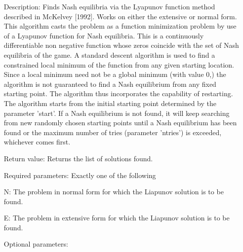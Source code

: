 \begin{itemize}
\bd
\item
[Description:] Finds Nash equilibria via the Lyapunov function method
described in McKelvey [1992].  Works on either the extensive or normal
form.  This algorithm casts the problem as a function minimization
problem by use of a Lyapunov function for Nash equilibria.  This is a
continuously differentiable non negative function whose zeros coincide
with the set of Nash equilibria of the game.  A standard descent
algorithm is used to find a constrained local minimum of the function
from any given starting location.  Since a local minimum need not be a
global minimum (with value 0,) the algorithm is not guaranteed to find
a Nash equilibrium from any fixed starting point.  The algorithm thus
incorporates the capability of restarting.  The algorithm starts from
the initial starting point determined by the parameter 'start'.  If a
Nash equilibrium is not found, it will keep searching from new
randomly chosen starting points until a Nash equilibrium has been
found or the maximum number of tries (parameter 'ntries') is exceeded,
whichever comes first.
\item
[Return value:] Returns the list of solutions found.
\item
[Required parameters:] Exactly one of the following \hfil\null

\bd
\item
[N:] The problem in normal form for which the Liapunov solution is to
be found.
\item
[E:] The problem in extensive form for which the Liapunov solution is
to be found.
\ed

\item
[Optional parameters:]\hfil\null


\end{itemize}

